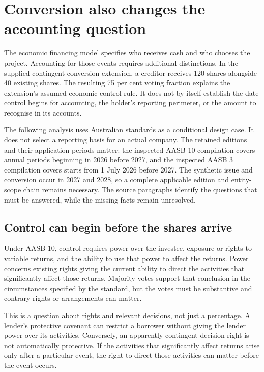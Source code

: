 \section{Conversion also changes the accounting question}
\label{sim:conversion-control-scope}

The economic financing model specifies who receives cash and who chooses the project. Accounting for those events requires additional distinctions. In the supplied contingent-conversion extension, a creditor receives 120 shares alongside 40 existing shares. The resulting 75 per cent voting fraction explains the extension's assumed economic control rule. It does not by itself establish the date control begins for accounting, the holder's reporting perimeter, or the amount to recognise in its accounts.

The following analysis uses Australian standards as a conditional design case. It does not select a reporting basis for an actual company. The retained editions and their application periods matter: the inspected AASB 10 compilation covers annual periods beginning in 2026 before 2027, and the inspected AASB 3 compilation covers starts from 1 July 2026 before 2027. The synthetic issue and conversion occur in 2027 and 2028, so a complete applicable edition and entity-scope chain remains necessary. The source paragraphs identify the questions that must be answered, while the missing facts remain unresolved.

\subsection{Control can begin before the shares arrive}

Under AASB 10, control requires power over the investee, exposure or rights to variable returns, and the ability to use that power to affect the returns. Power concerns existing rights giving the current ability to direct the activities that significantly affect those returns. Majority votes support that conclusion in the circumstances specified by the standard, but the votes must be substantive and contrary rights or arrangements can matter.\citep[paras.~6--18, B22--B28, B35--B37]{aasb10control2026}

This is a question about rights and relevant decisions, not just a percentage. A lender's protective covenant can restrict a borrower without giving the lender power over its activities. Conversely, an apparently contingent decision right is not automatically protective. If the activities that significantly affect returns arise only after a particular event, the right to direct those activities can matter before the event occurs.\citep[paras.~B26--B28, B53]{aasb10control2026}

